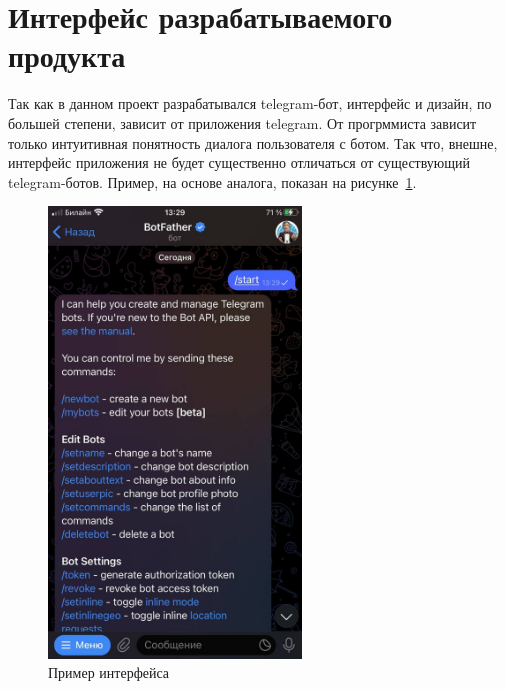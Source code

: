 \section{Интерфейс разрабатываемого продукта}
Так как в данном проект разрабатывался telegram-бот, интерфейс и дизайн,
по большей степени, зависит от приложения telegram. От прогрммиста
зависит только интуитивная понятность диалога пользователя с ботом.
Так что, внешне, интерфейс приложения не будет существенно отличаться от
существующий telegram-ботов. Пример, на основе аналога, показан
на рисунке~\ref{fig:interface:analog}.
\begin{figure}[h!tp]
	\centering
	\includegraphics[width=0.6\textwidth]{TelegramBotInterface}
	\caption{Пример интерфейса}
	\label{fig:interface:analog}
\end{figure}

